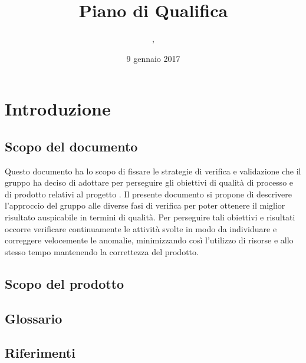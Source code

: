 

\usepackage{float}

\author{\LS, \AZ}
\supervisor{\GG}
\dest{\TV, \RC, \ZU}
\title{Piano di Qualifica}
\date{9 gennaio 2017}


\maketitle

\tableofcontents
\newpage

\section{Introduzione}
	\subsection{Scopo del documento}
	Questo documento ha lo scopo di fissare le strategie di verifica e validazione che il gruppo \hx{} ha deciso di adottare per perseguire gli obiettivi di qualità di processo e di prodotto relativi al progetto \proj{}. Il presente documento si propone di descrivere l'approccio del gruppo alle diverse fasi di verifica per poter ottenere il miglior risultato auspicabile in termini di qualità. Per perseguire tali obiettivi e risultati occorre verificare continuamente le attività svolte in modo da individuare e correggere velocemente le anomalie, minimizzando così l'utilizzo di risorse e allo stesso tempo mantenendo la correttezza del prodotto.

	\subsection{Scopo del prodotto}
	\scopo{}
	
	\subsection{Glossario}
	\presgloss{}
	
	\subsection{Riferimenti}

